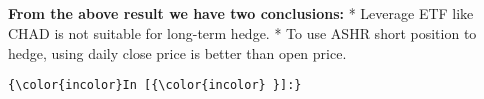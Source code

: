 \documentclass{article}
\begin{document}
    \begin{center}
    \end{center}
    { \hspace*{\fill} \\}
    
    \begin{center}
    \end{center}
    { \hspace*{\fill} \\}
    
    \begin{center}
    \end{center}
    { \hspace*{\fill} \\}
    
    \begin{center}
    \end{center}
    { \hspace*{\fill} \\}
    
    \textbf{From the above result we have two conclusions:} * Leverage ETF
like CHAD is not suitable for long-term hedge. * To use ASHR short
position to hedge, using daily close price is better than open price.

    

    \begin{Verbatim}[commandchars=\\\{\}]
{\color{incolor}In [{\color{incolor} }]:} 
\end{Verbatim}


    
    
    
    
\end{document}

